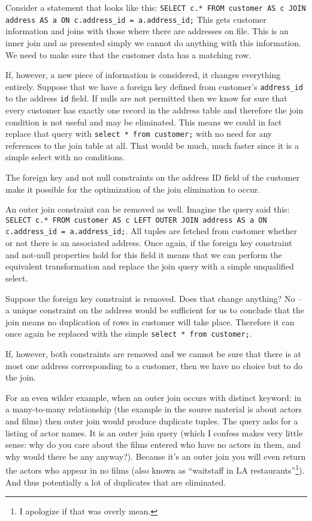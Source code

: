 Consider a statement that looks like this: \texttt{SELECT c.* FROM customer AS c JOIN address AS a ON c.address\_id = a.address\_id;} This gets customer information and joins with those where there are addresses on file. This is an inner join and as presented simply we cannot do anything with this information. We need to make sure that the customer data has a matching row.

If, however, a new piece of information is considered, it changes everything entirely. Suppose that we have a foreign key defined from customer's \texttt{address\_id} to the address \texttt{id} field. If nulls are not permitted then we know for sure that every customer has exactly one record in the address table and therefore the join condition is not useful and may be eliminated. This means we could in fact replace that query with \texttt{select * from customer;} with no need for any references to the join table at all. That would be much, much faster since it is a simple select with no conditions.

The foreign key and not null constraints on the address ID field of the customer make it possible for the optimization of the join elimination to occur.

An outer join constraint can be removed as well. Imagine the query said this: \texttt{SELECT c.* FROM customer AS c LEFT OUTER JOIN address AS a ON c.address\_id = a.address\_id;}. All tuples are fetched from customer whether or not there is an associated address. Once again, if the foreign key constraint and not-null properties hold for this field it means that we can perform the equivalent transformation and replace the join query with a simple unqualified select. 

Suppose the foreign key constraint is removed. Does that change anything? No -- a unique constraint on the address would be sufficient for us to conclude that the join means no duplication of rows in customer will take place. Therefore it can once again be replaced with the simple \texttt{select * from customer;}.

If, however, both constraints are removed and we cannot be sure that there is at most one address corresponding to a customer, then we have no choice but to do the join.

For an even wilder example, when an outer join occurs with distinct keyword: in a many-to-many relationship (the example in the source material is about actors and films) then outer join would produce duplicate tuples. The query asks for a listing of actor names. It is an outer join query (which I confess makes very little sense: why do you care about the films entered who have no actors in them, and why would there be any anyway?). Because it's an outer join you will even return the actors who appear in no films (also known as ``waitstaff in LA restaurants''\footnote{I apologize if that was overly mean.}). And thus potentially a lot of duplicates that are eliminated. 

